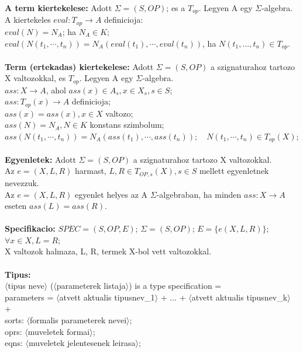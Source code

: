 \documentclass[a4paper,10pt]{article}
\begin{document}
%
\textbf{ A term kiertekelese:}  Adott $\Sigma=(S, OP)$; es a $T_{op}$. Legyen A egy $\Sigma$-algebra.\\
A kiertekeles $eval: T_{op} \to A$ definicioja:\\
$eval(N) = N_A$; ha $N_A \in K;$\\
$eval(N(t_1, \cdots, t_n)) = N_A(eval(t_1), \cdots, eval(t_n))$, ha $N(t_1, ..., t_n) \in T_{op}$.\\ \\
%
\textbf{Term (ertekadas) kiertekelese:}  Adott $\Sigma=(S,OP)$ a szignaturahoz tartozo X valtozokkal, es $T_{op}$. Legyen A egy $\Sigma$-algebra.\\
\indent $ass: X \to A$, ahol $ass(x) \in A_s, x \in X_s, s \in S$;\\
\indent $ass: T_{op}(x) \to A$ definicioja;\\
\indent $ass(x) = ass(x), x \in X$ valtozo;\\
\indent $ass(N) = N_A, N \in K$ konstans szimbolum;\\
\indent $ass(N(t_1, \cdots, t_n)) = N_A(ass(t_1), \cdots, ass(t_n)); \quad N(t_1, \cdots, t_n) \in T_{op}(X)$;\\ \\
\textbf{Egyenletek:} Adott $\Sigma=(S,OP)$ a szignaturahoz tartozo X valtozokkal.\\
Az $e=(X,L,R)$ harmast, $L, R \in T_{OP, s}(X), s \in S$ mellett egyenletnek nevezzuk.\\
Az $e=(X,L,R)$ egyenlet helyes az A $\Sigma$-algebraban, ha minden $ass: X\to A$ eseten $ass(L)=ass(R)$.\\ \\
\textbf{Specifikacio:} $SPEC=(S,OP,E)$; $\Sigma = (S, OP)$; $E=\lbrace e(X, L, R)\rbrace$; $\forall x \in X, L=R$;\\
X valtozok halmaza, L, R, termek X-bol vett valtozokkal.\\ \\
\textbf{Tipus:}\\
$\langle$tipus neve$\rangle$ ($\langle$parameterek listaja$\rangle$) is a type specification =\\
\indent parameters = $\langle$atvett aktualis tipusnev\_1$\rangle$ + ... + $\langle$atvett aktualis tipusnev\_k$\rangle$ +\\
\indent \indent sorts: $\langle$formalis parameterek nevei$\rangle$;\\
\indent \indent oprs: $\langle$muveletek formai$\rangle$;\\
\indent \indent eqns: $\langle$muveletek jelentesenek leirasa$\rangle$;\\
\end{document}
